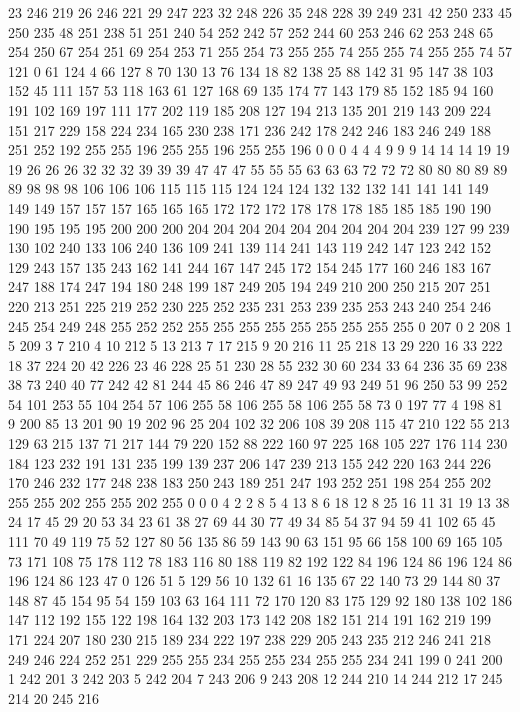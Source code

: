 23 246 219 26 246 221 29 247 223 32 248 226 35 248 228 39 249 231 42 250 233 45 250 235 48 251 238 51 251 240 54 252 242 57 252 244 60 253 246 62 253 248 65 254 250 67 254 251 69 254 253 71 255 254 73 255 255 74 255 255 74 255 255 74 57 121 0 61 124 4 66 127 8 70 130 13 76 134 18 82 138 25 88 142 31 95 147 38 103 152 45 111 157 53 118 163 61 127 168 69 135 174 77 143 179 85 152 185 94 160 191 102 169 197 111 177 202 119 185 208 127 194 213 135 201 219 143 209 224 151 217 229 158 224 234 165 230 238 171 236 242 178 242 246 183 246 249 188 251 252 192 255 255 196 255 255 196 255 255 196 0 0 0 4 4 4 9 9 9 14 14 14 19 19 19 26 26 26 32 32 32 39 39 39 47 47 47 55 55 55 63 63 63 72 72 72 80 80 80 89 89 89 98 98 98 106 106 106 115 115 115 124 124 124 132 132 132 141 141 141 149 149 149 157 157 157 165 165 165 172 172 172 178 178 178 185 185 185 190 190 190 195 195 195 200 200 200 204 204 204 204 204 204 204 204 204 
239 127 99 239 130 102 240 133 106 240 136 109 241 139 114 241 143 119 242 147 123 242 152 129 243 157 135 243 162 141 244 167 147 245 172 154 245 177 160 246 183 167 247 188 174 247 194 180 248 199 187 249 205 194 249 210 200 250 215 207 251 220 213 251 225 219 252 230 225 252 235 231 253 239 235 253 243 240 254 246 245 254 249 248 255 252 252 255 255 255 255 255 255 255 255 255 0 207 0 2 208 1 5 209 3 7 210 4 10 212 5 13 213 7 17 215 9 20 216 11 25 218 13 29 220 16 33 222 18 37 224 20 42 226 23 46 228 25 51 230 28 55 232 30 60 234 33 64 236 35 69 238 38 73 240 40 77 242 42 81 244 45 86 246 47 89 247 49 93 249 51 96 250 53 99 252 54 101 253 55 104 254 57 106 255 58 106 255 58 106 255 58 73 0 197 77 4 198 81 9 200 85 13 201 90 19 202 96 25 204 102 32 206 108 39 208 115 47 210 122 55 213 129 63 215 137 71 217 144 79 220 152 88 222 160 97 225 168 105 227 176 114 230 184 123 232 191 131 235 199 139 237 206 147 239 213 
155 242 220 163 244 226 170 246 232 177 248 238 183 250 243 189 251 247 193 252 251 198 254 255 202 255 255 202 255 255 202 255 0 0 0 4 2 2 8 5 4 13 8 6 18 12 8 25 16 11 31 19 13 38 24 17 45 29 20 53 34 23 61 38 27 69 44 30 77 49 34 85 54 37 94 59 41 102 65 45 111 70 49 119 75 52 127 80 56 135 86 59 143 90 63 151 95 66 158 100 69 165 105 73 171 108 75 178 112 78 183 116 80 188 119 82 192 122 84 196 124 86 196 124 86 196 124 86 123 47 0 126 51 5 129 56 10 132 61 16 135 67 22 140 73 29 144 80 37 148 87 45 154 95 54 159 103 63 164 111 72 170 120 83 175 129 92 180 138 102 186 147 112 192 155 122 198 164 132 203 173 142 208 182 151 214 191 162 219 199 171 224 207 180 230 215 189 234 222 197 238 229 205 243 235 212 246 241 218 249 246 224 252 251 229 255 255 234 255 255 234 255 255 234 241 199 0 241 200 1 242 201 3 242 203 5 242 204 7 243 206 9 243 208 12 244 210 14 244 212 17 245 214 20 245 216 
